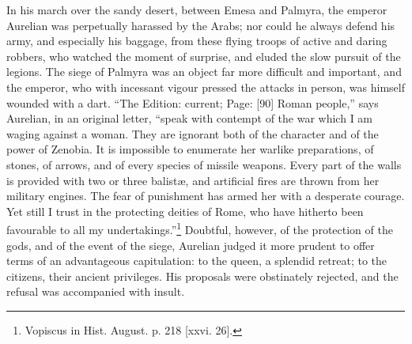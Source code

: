 In his march over the sandy desert, between Emesa and Palmyra, the emperor Aurelian was perpetually harassed by the Arabs; nor could he always defend his army, and especially his baggage, from these flying troops of active and daring robbers, who watched the moment of surprise, and eluded the slow pursuit of the legions. The siege of Palmyra was an object far more difficult and important, and the emperor, who with incessant vigour pressed the attacks in person, was himself wounded with a dart. \texthebrew{“}The Edition: current; Page: [90] Roman people,\texthebrew{}” says Aurelian, in an original letter, \texthebrew{“}speak with contempt of the war which I am waging against a woman. They are ignorant both of the character and of the power of Zenobia. It is impossible to enumerate her warlike preparations, of stones, of arrows, and of every species of missile weapons. Every part of the walls is provided with two or three balistæ, and artificial fires are thrown from her military engines. The fear of punishment has armed her with a desperate courage. Yet still I trust in the protecting deities of Rome, who have hitherto been favourable to all my undertakings.\texthebrew{}”\footnote{Vopiscus in Hist. August. p. 218 [xxvi. 26].} Doubtful, however, of the protection of the gods, and of the event of the siege, Aurelian judged it more prudent to offer terms of an advantageous capitulation: to the queen, a splendid retreat; to the citizens, their ancient privileges. His proposals were obstinately rejected, and the refusal was accompanied with insult.

